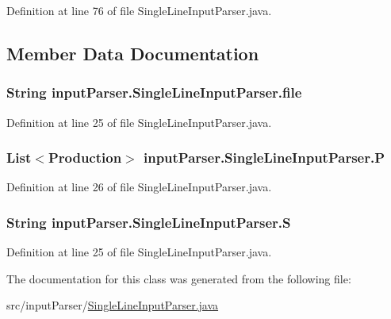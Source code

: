 Definition at line 76 of file Single\-Line\-Input\-Parser.\-java.



\subsection{Member Data Documentation}
\hypertarget{classinput_parser_1_1_single_line_input_parser_a46401abfc8915fde62cc6109f520028a}{
\subsubsection[{file}]{\setlength{\rightskip}{0pt plus 5cm}String {\bf input\-Parser.\-Single\-Line\-Input\-Parser.\-file}}}\label{classinput_parser_1_1_single_line_input_parser_a46401abfc8915fde62cc6109f520028a}


Definition at line 25 of file Single\-Line\-Input\-Parser.\-java.

\hypertarget{classinput_parser_1_1_single_line_input_parser_a07d3d934d89d64a72eb0a06b89e684a8}{
\subsubsection[{P}]{\setlength{\rightskip}{0pt plus 5cm}List$<${\bf Production}$>$ {\bf input\-Parser.\-Single\-Line\-Input\-Parser.\-P}}}\label{classinput_parser_1_1_single_line_input_parser_a07d3d934d89d64a72eb0a06b89e684a8}


Definition at line 26 of file Single\-Line\-Input\-Parser.\-java.

\hypertarget{classinput_parser_1_1_single_line_input_parser_afaca00d01ba13c5fc39fe11309aba895}{
\subsubsection[{S}]{\setlength{\rightskip}{0pt plus 5cm}String {\bf input\-Parser.\-Single\-Line\-Input\-Parser.\-S}}}\label{classinput_parser_1_1_single_line_input_parser_afaca00d01ba13c5fc39fe11309aba895}


Definition at line 25 of file Single\-Line\-Input\-Parser.\-java.



The documentation for this class was generated from the following file\-:\begin{DoxyCompactItemize}
\item 
src/input\-Parser/\hyperlink{_single_line_input_parser_8java}{Single\-Line\-Input\-Parser.\-java}\end{DoxyCompactItemize}
